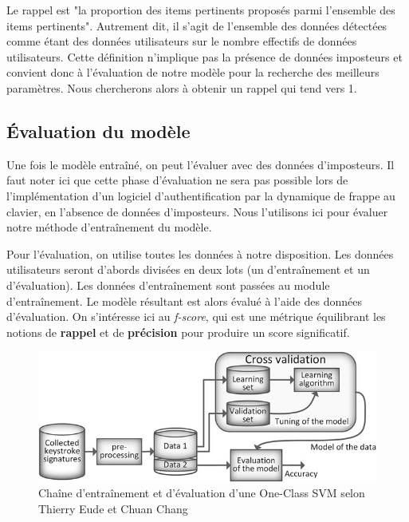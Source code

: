 Le rappel est "la proportion des items pertinents proposés parmi l'ensemble des items pertinents". Autrement dit, il s'agit de l'ensemble des données détectées comme étant des données utilisateurs sur le nombre effectifs de données utilisateurs. Cette définition n'implique pas la présence de données imposteurs et convient donc à l'évaluation de notre modèle pour la recherche des meilleurs paramètres. Nous chercherons alors à obtenir un rappel qui tend vers 1.

\subsection{Évaluation du modèle}

Une fois le modèle entraîné, on peut l'évaluer avec des données d'imposteurs. Il faut noter ici que cette phase d'évaluation ne sera pas possible lors de l'implémentation d'un logiciel d'authentification par la dynamique de frappe au clavier, en l'absence de données d'imposteurs. Nous l'utilisons ici pour évaluer notre méthode d'entraînement du modèle.

Pour l'évaluation, on utilise toutes les données à notre disposition. Les données utilisateurs seront d'abords divisées en deux lots (un d'entraînement et un d'évaluation). Les données d'entraînement sont passées au module d'entraînement. Le modèle résultant est alors évalué à l'aide des données d'évaluation. On s'intéresse ici au \textit{f-score}, qui est une métrique équilibrant les notions de \textbf{rappel} et de \textbf{précision} pour produire un score significatif.

\begin{figure}[]
    \centering
    \includegraphics[width=\linewidth]{res/ocsvm.png}
    \caption{Chaîne d'entraînement et d'évaluation d'une One-Class SVM selon Thierry Eude et Chuan Chang\cite{doi:10.1111/coin.12122}}
    \label{ocsvm}
\end{figure}
